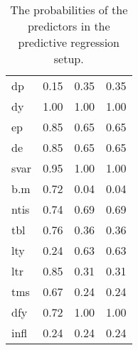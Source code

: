 \begin{sidewaystable}[ht]
\centering
\caption{The probabilities of the predictors in the predictive regression setup.}
\begin{tabular}{ lccc } 
\toprule 
dp & 0.15 & 0.35 & 0.35 \\ 
dy & 1.00 & 1.00 & 1.00 \\ 
ep & 0.85 & 0.65 & 0.65 \\ 
de & 0.85 & 0.65 & 0.65 \\ 
svar & 0.95 & 1.00 & 1.00 \\ 
b.m & 0.72 & 0.04 & 0.04 \\ 
ntis & 0.74 & 0.69 & 0.69 \\ 
tbl & 0.76 & 0.36 & 0.36 \\ 
lty & 0.24 & 0.63 & 0.63 \\ 
ltr & 0.85 & 0.31 & 0.31 \\ 
tms & 0.67 & 0.24 & 0.24 \\ 
dfy & 0.72 & 1.00 & 1.00 \\ 
infl & 0.24 & 0.24 & 0.24 \\ 
\bottomrule 
\end{tabular} 
\end{sidewaystable}

